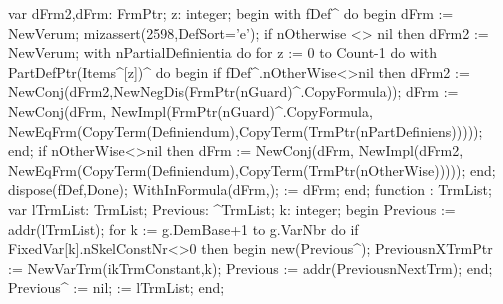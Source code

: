 var
   dFrm2,dFrm: FrmPtr;
   z: integer;
begin
   with fDef^ do
   begin
      dFrm := NewVerum;
      mizassert(2598,DefSort='e');
      if nOtherwise <> nil then dFrm2 := NewVerum;
      with nPartialDefinientia do
         for z := 0 to Count-1 do
            with PartDefPtr(Items^[z])^ do
         begin
            if fDef^.nOtherWise<>nil then
               dFrm2 := NewConj(dFrm2,NewNegDis(FrmPtr(nGuard)^.CopyFormula));
            dFrm := NewConj(dFrm,
                            NewImpl(FrmPtr(nGuard)^.CopyFormula,
                                    NewEqFrm(CopyTerm(Definiendum),CopyTerm(TrmPtr(nPartDefiniens)))));
         end;
      if nOtherWise<>nil then
         dFrm := NewConj(dFrm,
                         NewImpl(dFrm2,
                                 NewEqFrm(CopyTerm(Definiendum),CopyTerm(TrmPtr(nOtherWise)))));
   end;
   dispose(fDef,Done);
   WithInFormula(dFrm,);
    := dFrm;
end;
\eatline
{}\nwendcode{}\nwdocspar
\nwenddocs{}\endmoddef\nwstartdeflinemarkup{}\nwenddeflinemarkup
function : TrmList;
var
   lTrmList: TrmList;
   Previous: ^TrmList;
   k: integer;
begin
   Previous := addr(lTrmList);
   for k := g.DemBase+1 to g.VarNbr do
      if FixedVar[k].nSkelConstNr<>0 then
      begin
         new(Previous^);
         Previous^^.XTrmPtr := NewVarTrm(ikTrmConstant,k);
         Previous := addr(Previous^^.NextTrm);
      end;
   Previous^ := nil;
    := lTrmList;
end;
\eatline
